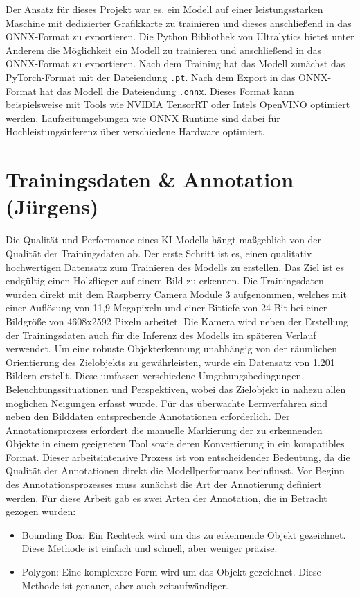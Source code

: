 Der Ansatz für dieses Projekt war es, ein Modell auf einer leistungsstarken Maschine mit dedizierter Grafikkarte zu trainieren und dieses anschließend in das ONNX-Format zu exportieren. Die Python Bibliothek von Ultralytics bietet unter Anderem die Möglichkeit ein Modell zu trainieren und anschließend in das ONNX-Format zu exportieren. Nach dem Training hat das Modell zunächst das PyTorch-Format mit der Dateiendung \texttt{.pt}.
Nach dem Export in das ONNX-Format hat das Modell die Dateiendung \texttt{.onnx}. Dieses Format kann beispielsweise mit Tools wie NVIDIA TensorRT oder Intels OpenVINO optimiert werden. Laufzeitumgebungen wie ONNX Runtime sind dabei für Hochleistungsinferenz über verschiedene Hardware optimiert. \cite{ultralyticsGlossaryONNX}


\section{Trainingsdaten \& Annotation (Jürgens)}
Die Qualität und Performance eines KI-Modells hängt maßgeblich von der Qualität der Trainingsdaten ab. Der erste Schritt ist es, einen qualitativ hochwertigen Datensatz zum Trainieren des Modells zu erstellen. Das Ziel ist es endgültig einen Holzflieger auf einem Bild zu erkennen. Die Trainingsdaten wurden direkt mit dem Raspberry Camera Module 3 aufgenommen, welches mit einer Auflösung von 11,9 Megapixeln und einer Bittiefe von 24 Bit bei einer Bildgröße von 4608x2592 Pixeln arbeitet. \cite{raspberrypi5cammodule3} Die Kamera wird neben der Erstellung der Trainingsdaten auch für die Inferenz des Modells im späteren Verlauf verwendet. 
Um eine robuste Objekterkennung unabhängig von der räumlichen Orientierung des Zielobjekts zu gewährleisten, wurde ein Datensatz von 1.201 Bildern erstellt. Diese umfassen verschiedene Umgebungsbedingungen, Beleuchtungssituationen und Perspektiven, wobei das Zielobjekt in nahezu allen möglichen Neigungen erfasst wurde.
Für das überwachte Lernverfahren sind neben den Bilddaten entsprechende Annotationen erforderlich. Der Annotationsprozess erfordert die manuelle Markierung der zu erkennenden Objekte in einem geeigneten Tool sowie deren Konvertierung in ein kompatibles Format. Dieser arbeitsintensive Prozess ist von entscheidender Bedeutung, da die Qualität der Annotationen direkt die Modellperformanz beeinflusst. Vor Beginn des Annotationsprozesses muss zunächst die Art der Annotierung definiert werden.
Für diese Arbeit gab es zwei Arten der Annotation, die in Betracht gezogen wurden:
\begin{itemize}
  \item Bounding Box: Ein Rechteck wird um das zu erkennende Objekt gezeichnet. Diese Methode ist einfach und schnell, aber weniger präzise.
  \item Polygon: Eine komplexere Form wird um das Objekt gezeichnet. Diese Methode ist genauer, aber auch zeitaufwändiger.
\end{itemize}
